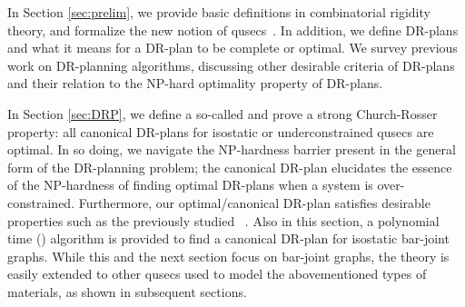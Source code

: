 In Section \ref{sec:prelim}, we provide basic definitions in combinatorial rigidity theory,  and formalize the new notion of qusecs~\cite{sitharam2010optimized,sitharam2006well,sitharam2010reconciling}.
In addition, we define DR-plans and what it means for a DR-plan to be complete or optimal. We survey previous work on DR-planning algorithms, discussing other desirable criteria of DR-plans and their relation to the NP-hard optimality property of DR-plans.



In Section \ref{sec:DRP}, we define a so-called  and prove a strong Church-Rosser property: all canonical DR-plans for isostatic or underconstrained qusecs are optimal. In so doing, we navigate the NP-hardness barrier present in the general form of the DR-planning problem; the canonical DR-plan elucidates the essence of the NP-hardness of finding optimal DR-plans when a system is over-constrained. Furthermore, our optimal/canonical DR-plan satisfies desirable properties such as the previously studied ~\cite{hoffman2001decompositionI}. Also in this section, a polynomial time (\candrpcomplexity) algorithm is provided to find a canonical DR-plan for isostatic bar-joint graphs.  While this and the next section focus on bar-joint graphs, the theory is easily extended to other qusecs used to model the abovementioned types of materials, as shown in subsequent sections.


